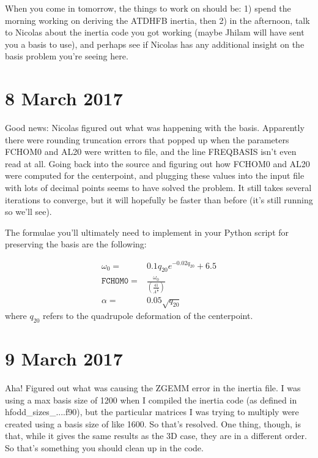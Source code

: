 \documentclass[]{report}
\begin{document}
When you come in tomorrow, the things to work on should be: 1) spend the morning working on deriving the ATDHFB inertia, then 2) in the afternoon, talk to Nicolas about the inertia code you got working (maybe Jhilam will have sent you a basis to use), and perhaps see if Nicolas has any additional insight on the basis problem you're seeing here.

\section*{8 March 2017}
Good news: Nicolas figured out what was happening with the basis. Apparently there were rounding truncation errors that popped up when the parameters FCHOM0 and AL20 were written to file, and the line FREQBASIS isn't even read at all. Going back into the source and figuring out how FCHOM0 and AL20 were computed for the centerpoint, and plugging these values into the input file with lots of decimal points seems to have solved the problem. It still takes several iterations to converge, but it will hopefully be faster than before (it's still running so we'll see).

The formulae you'll ultimately need to implement in your Python script for preserving the basis are the following:

\begin{eqnarray}
\omega_0        =& 0.1q_{20}e^{-0.02q_{20}}+6.5 \\
\mathtt{FCHOM0} =& \frac{\omega_0}{\left(\frac{41}{A^\frac{1}{3}}\right)} \\
\alpha          =& 0.05\sqrt{q_{20}}
\end{eqnarray}
\noindent where $q_{20}$ refers to the quadrupole deformation of the centerpoint.

\section*{9 March 2017}
Aha! Figured out what was causing the ZGEMM error in the inertia file. I was using a max basis size of 1200 when I compiled the inertia code (as defined in hfodd\_sizes\_....f90), but the particular matrices I was trying to multiply were created using a basis size of like 1600. So that's resolved. One thing, though, is that, while it gives the same results as the 3D case, they are in a different order. So that's something you should clean up in the code. 
\end{document}

